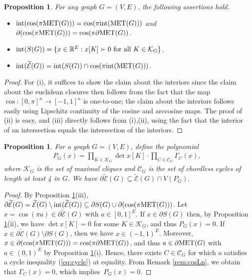 \documentclass[a4paper, 11pt, twoside]{article}
\newcommand{\R}{\mathbb{R}}
\newcommand{\ME}{{\mathcal E}}
\newcommand{\MET}{\text{\rm MET}}
\newcommand{\MK}{{\mathcal K}}
\newcommand{\MC}{{\mathcal C}}
\newcommand{\tME}{\widetilde \ME}
\theoremstyle{plain}
\newtheorem{proposition}[theorem]{Proposition}
\begin{document}
\begin{proposition}\label{proposition:cosboundMET}
For any graph $G=(V,E)$, the following assertions hold.
\begin{itemize}
\item[(i)] $\text{\rm int}(\cos(\pi \MET(G)))= \cos(\pi \text{\rm int}(\MET(G)))$ and 
$\partial (\cos(\pi \MET(G)))= \cos(\pi \partial \MET(G))$.
\item[(ii)]
$\text{\rm int}(S(G))=\{x\in \R^E: x[K]\succ 0 \text{ for all } K\in \MK_G\}$. 
\item[(iii)] $\text{\rm int}(\tME(G)) = \text{\rm int}(S(G)) \cap \cos(\pi \text{\rm int}(\MET(G)))$.
\end{itemize}
\end{proposition}

\begin{proof}
For (i), it suffices to show the claim about the interiors since the claim about the euclidean closures then follows from the fact that the map $\cos:[0,\pi]^n \rightarrow [-1,1]^n$ is one-to-one;
 the claim about the interiors follows easily using Lipschitz continuity of the cosine and arccosine maps.
The proof of (ii) is easy, and (iii) directly follows from (i),(ii), using the fact that the interior of an intersection equals the intersection of the interiors.
\end{proof}

\begin{proposition}\label{proposition:VPn}
For a graph $G=(V,E)$, define the polynomial 
\begin{align}\label{eq:boundaryG}
P_G(x)= \prod _{K\in\MK_G} \det x[K] \cdot \prod_{C\in \MC_G} \Gamma_C(x),
\end{align}
where $\MK_G$ is the set of maximal cliques and  $\MC_G$ is the set of chordless cycles of length at least 4 in $G$.
We have  $\partial \tME(G)\subseteq  \tME(G) \cap V(P_G).$
\end{proposition}

\begin{proof}
By Proposition \ref{proposition:cosboundMET}(iii),    $\partial \tME(G)= \tME(G)  \setminus \text{\rm int}(\tME(G))\subseteq \partial S(G) \cup \partial (\cos(\pi\MET(G)))$.
Let $x=\cos(\pi a)\in \partial \tME(G)$ with $a\in[0,1]^E$. If $x\in\partial S(G)$ then, by Proposition \ref{proposition:cosboundMET}(ii),  we have $\det x[K]=0$ for some   $K\in\MK_G$, and thus $P_G(x)=0$.  
If $x \in \partial \tME(G) \setminus \partial S(G)$, then we have $x\in (-1,1)^E$. Moreover,  $x\in \partial (\cos(\pi \MET(G)))=\cos(\pi \partial \MET(G))$, and thus $a\in\partial \MET(G)$ with $a \in (0,1)^E$ by Proposition \ref{proposition:cosboundMET}(i). Hence, there exists $C\in \MC_G$ for which $a$ satisfies a cycle inequality (\ref{eq:cycle}) at equality. From Remark \ref{rem:cosLn},  we obtain that $\Gamma_C(x)=0$, which implies~$P_G(x)=0$.
  \end{proof}
\end{document}
